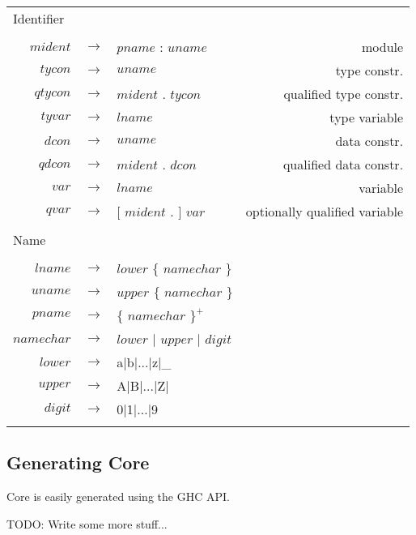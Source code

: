 \begin{footnotesize}
\begin{longtable}{ r c l r }
\multicolumn{4}{l}{Identifier}			 \\
\\[0.01in]
$mident$	& $ \rightarrow $	& $pname$ : $uname$									& module		\\
$tycon$		& $ \rightarrow $	& $uname$										& type constr.		\\
$qtycon$	& $ \rightarrow $	& $mident$ . $tycon$									& qualified type constr.\\
$tyvar$		& $ \rightarrow $	& $lname$										& type variable		\\
$dcon$		& $ \rightarrow $	& $uname$										& data constr.		\\
$qdcon$		& $ \rightarrow $	& $mident$ . $dcon$									& qualified data constr.\\
$var$		& $ \rightarrow $	& $lname$										& variable		\\
$qvar$		& $ \rightarrow $	& $[$ $mident$ . $]$ $var$								& optionally qualified variable\\
\\[0.01in]

\multicolumn{4}{l}{Name}			 \\
\\[0.01in]
$lname$		& $ \rightarrow $	& $lower$ $\{$ $namechar$ $\}$								& \\
$uname$		& $ \rightarrow $	& $upper$ $\{$ $namechar$ $\}$								& \\
$pname$		& $ \rightarrow $	& $\{$ $namechar$ $\}^{+}$								& \\
$namechar$	& $ \rightarrow $	& $lower$ $|$ $upper$ $|$ $digit$							& \\
$lower$		& $ \rightarrow $	& a$|$b$|$...$|$z$|$\_									& \\
$upper$		& $ \rightarrow $	& A$|$B$|$...$|$Z$|$									& \\
$digit$		& $ \rightarrow $	& 0$|$1$|$...$|$9									& \\
\\[0.01in]

\end{longtable}
\end{footnotesize}


\subsection{Generating Core}

Core is easily generated using the GHC API.

TODO: Write some more stuff...
